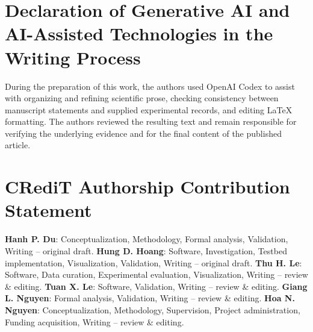 \documentclass[final,5p]{elsarticle}
\begin{document}
\section*{Declaration of Generative AI and AI-Assisted Technologies in the Writing Process}
During the preparation of this work, the authors used OpenAI Codex to assist with organizing and refining scientific prose, checking consistency between manuscript statements and supplied experimental records, and editing LaTeX formatting. The authors reviewed the resulting text and remain responsible for verifying the underlying evidence and for the final content of the published article.

\section*{CRediT Authorship Contribution Statement}
\textbf{Hanh P. Du}: Conceptualization, Methodology, Formal analysis, Validation, Writing -- original draft.
\textbf{Hung D. Hoang}: Software, Investigation, Testbed implementation, Visualization, Validation, Writing -- original draft.
\textbf{Thu H. Le}: Software, Data curation, Experimental evaluation, Visualization, Writing -- review \& editing.
\textbf{Tuan X. Le}: Software, Validation, Writing -- review \& editing.
\textbf{Giang L. Nguyen}: Formal analysis, Validation, Writing -- review \& editing.
\textbf{Hoa N. Nguyen}: Conceptualization, Methodology, Supervision, Project administration, Funding acquisition, Writing -- review \& editing.



\end{document}
